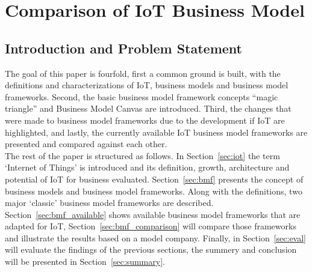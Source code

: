 
\chapter{Comparison of IoT Business Model}


\newpage

\minitoc %

\newpage

\renewcommand{\labelitemii}{$\diamond$}
\renewcommand{\labelitemiii}{$\circ$}

\section{Introduction and Problem Statement}
	The goal of this paper is fourfold, first a common ground is built, with the definitions and characterizations of IoT, business models and business model frameworks. Second, the basic business model framework concepts ``magic triangle'' and  Business Model Canvas are introduced. Third, the changes that were made to business model frameworks due to the development if IoT are highlighted, and lastly, the currently available IoT business model frameworks are presented and compared against each other.\\
	The rest of the paper is structured as follows. In Section~\ref{sec:iot} the term `Internet of Things' is introduced and its definition, growth, architecture and potential of IoT for business evaluated. Section~\ref{sec:bmf} presents the concept of business models and business model frameworks. Along with the definitions, two major `classic' business model frameworks are described. Section~\ref{sec:bmf_available} shows available business model frameworks that are adapted for IoT, Section~\ref{sec:bmf_comparison} will compare those frameworks and illustrate the results based on a model company. Finally, in Section~\ref{sec:eval} will evaluate the findings of the previous sections, the summery and conclusion will be presented in Section~\ref{sec:summary}. 
 
